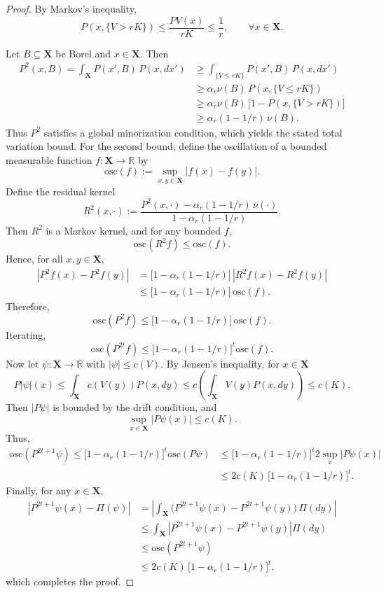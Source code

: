 \documentclass[ejsv2, noshowframe]{imsart}
\theoremstyle{plain}
\theoremstyle{definition}
\theoremstyle{remark}
\newcommand{\R}{\mathbb{R}}
\renewcommand{\P}{P}
\newcommand{\X}{\textbf{X}}
\begin{document}
\begin{proof}
By Markov's inequality,
\[
P(x, \{ V > rK \})
\le \frac{PV(x)}{rK}
\le \frac{1}{r},
\qquad \forall x \in \X.
\]

Let $B \subseteq \X$ be Borel and $x \in \X$. Then
\begin{align*}
P^2(x,B)
= \int_{\X} P(x',B)\, P(x,dx') 
&\ge \int_{\{V \le rK\}} P(x',B)\, P(x,dx') \\
&\ge \alpha_r \nu(B)\, P(x,\{V \le rK\}) \\
&\ge \alpha_r \nu(B)\, \big[1 - P(x,\{V > rK\})\big] \\
&\ge \alpha_r (1 - 1/r)\, \nu(B).
\end{align*}
Thus $P^2$ satisfies a global minorization condition, which yields the stated total variation bound. For the second bound, define the oscillation of a bounded measurable function $f : \X \to \R$ by
\[
\text{osc}(f) := \sup_{x,y \in \X} |f(x) - f(y)|.
\]
Define the residual kernel
\[
R^2(x,\cdot)
:=
\frac{P^2(x,\cdot) - \alpha_r (1 - 1/r)\,\nu(\cdot)}
{1 - \alpha_r (1 - 1/r)}.
\]
Then $R^2$ is a Markov kernel, and for any bounded $f$,
\[
\text{osc}(R^2 f) \le \text{osc}(f).
\]
Hence, for all $x,y \in \X$,
\begin{align*}
|P^2 f(x) - P^2 f(y)|
&= \big[1 - \alpha_r (1 - 1/r)\big]\, |R^2 f(x) - R^2 f(y)| \\
&\le \big[1 - \alpha_r (1 - 1/r)\big]\, \text{osc}(f).
\end{align*}
Therefore,
\[
\text{osc}(P^2 f)
\le \big[1 - \alpha_r (1 - 1/r)\big]\, \text{osc}(f).
\]
Iterating,
\[
\text{osc}(P^{2t} f)
\le \big[1 - \alpha_r (1 - 1/r)\big]^t \text{osc}(f).
\]
Now let $\psi : \X \to \R$ with $|\psi| \le c(V)$. 
By Jensen's inequality, for $x \in \X$
\[
\P |\psi|(x) 
\le \int_{\X} c(V(y)) \P(x, dy)
\le c\left( \int_{\X} V(y) \P(x, dy) \right)
\le c( K ).
\]
Then $| P\psi |$ is bounded by the drift condition, and
\[
\sup_{x \in \X} |P\psi(x)| \le c( K ).
\]
Thus,
\begin{align*}
\text{osc}(P^{2t+1}\psi)
\le \big[1 - \alpha_r (1 - 1/r)\big]^t \text{osc}(P\psi) 
&\le \big[1 - \alpha_r (1 - 1/r)\big]^t 2 \sup_{x} |P\psi(x)| \\
&\le 2 c(K) \, \big[1 - \alpha_r (1 - 1/r)\big]^t.
\end{align*}
Finally, for any $x \in \X$,
\begin{align*}
\left| P^{2t+1}\psi(x) - \Pi(\psi) \right|
&= \left| \int_{\X} \big(P^{2t+1}\psi(x) - P^{2t+1}\psi(y)\big)\, \Pi(dy) \right| \\
&\le \int_{\X} \left| P^{2t+1}\psi(x) - P^{2t+1}\psi(y) \right| \Pi(dy) \\
&\le \text{osc}(P^{2t+1}\psi) \\
&\le 2 c(K) \, \big[1 - \alpha_r (1 - 1/r)\big]^t,
\end{align*}
which completes the proof.
\end{proof}
\end{document}
